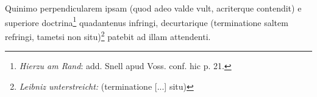 \pstart [p.~37] Quinimo perpendicularem ipsam (quod adeo valde vult, acriterque contendit) e superiore doctrina\footnote{\textit{Hierzu am Rand}: add. Snell\protect{} apud Voss.\protect{} conf. hic p. 21.} quadantenus infringi, decurtarique (terminatione saltem refringi, tametsi non situ)\footnote{\textit{Leibniz unterstreicht:} (terminatione [...] situ)} patebit ad illam attendenti.
 \pend